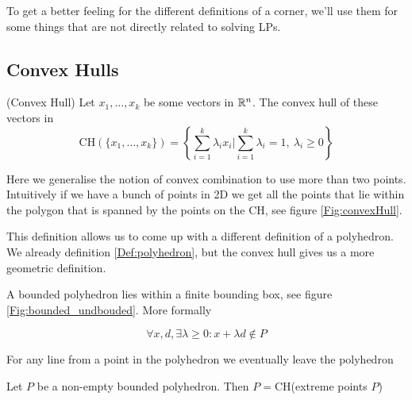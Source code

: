 To get a better feeling for the different definitions of a corner, we'll use them for some things that are not directly related to solving LPs.

\subsection*{Convex Hulls}
\begin{Def}(Convex Hull) Let $x_1,\ldots,x_k$ be some vectors in $\mathbb{R}^n$. The convex hull of these vectors in
\[\mbox{CH}(\{x_1,\ldots,x_k\}) = \left\{\sum _{i=1}^k \lambda_i x_i \Big| \sum_{i=1}^k \lambda_i =1,\ \lambda_i\geq 0\right\}\]
\end{Def}

Here we generalise the notion of convex combination to use more than two points. Intuitively if we have a bunch of points in 2D we get all the points that lie within the polygon that is spanned by the points on the CH, see figure \ref{Fig:convexHull}.

This definition allows us to come up with a different definition of a polyhedron. We already definition \ref{Def:polyhedron}, but the convex hull gives us a more geometric definition.

\begin{Def} A bounded polyhedron lies within a finite bounding box, see figure \ref{Fig:bounded_undbouded}. More formally

\[\forall x,d, \exists \lambda\geq 0: x+\lambda d \not \in P\]

For any line from a point in the polyhedron we eventually leave the polyhedron
\end{Def}

\begin{thm}\label{Thm:CH_polyhedron} Let $P$ be a non-empty bounded polyhedron. Then $P=$CH(extreme points $P$)
\end{thm}


